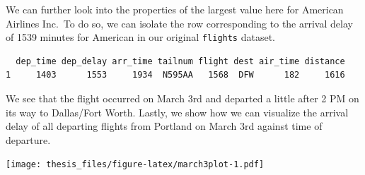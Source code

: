 \documentclass[12pt,twoside]{reedthesis}
\newenvironment{Shaded}{\begin{snugshade}}{\end{snugshade}}
\newcommand{\DataTypeTok}[1]{\textcolor[rgb]{0.13,0.29,0.53}{#1}}
\newcommand{\DecValTok}[1]{\textcolor[rgb]{0.00,0.00,0.81}{#1}}
\newcommand{\KeywordTok}[1]{\textcolor[rgb]{0.13,0.29,0.53}{\textbf{#1}}}
\newcommand{\NormalTok}[1]{#1}
\newcommand{\OperatorTok}[1]{\textcolor[rgb]{0.81,0.36,0.00}{\textbf{#1}}}
\newcommand{\StringTok}[1]{\textcolor[rgb]{0.31,0.60,0.02}{#1}}
\begin{document}
We can further look into the properties of the largest value here for American Airlines Inc.~To do so, we can isolate the row corresponding to the arrival delay of 1539 minutes for American in our original \texttt{flights} dataset.
\begin{Shaded}
\end{Shaded}
\begin{verbatim}
  dep_time dep_delay arr_time tailnum flight dest air_time distance
1     1403      1553     1934  N595AA   1568  DFW      182     1616
\end{verbatim}
We see that the flight occurred on March 3rd and departed a little after 2 PM on its way to Dallas/Fort Worth. Lastly, we show how we can visualize the arrival delay of all departing flights from Portland on March 3rd against time of departure.
\begin{Shaded}
\end{Shaded}
\texttt{[image: thesis\_files/figure-latex/march3plot-1.pdf]}
\end{document}
